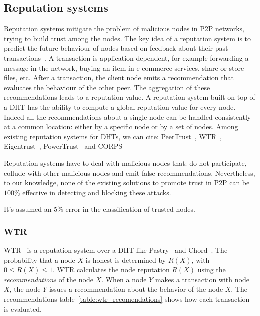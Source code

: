 \subsection{Reputation systems}
\label{sec:reputation_systems}
Reputation systems mitigate the problem of malicious nodes in
P2P networks, trying to build trust among the nodes. The key
idea of a reputation system is to predict the future behaviour
of nodes based on feedback about their past
transactions~\cite{Resnick:2000:RS:355112.355122}. A
transaction is application dependent, for example forwarding a
message in the network, buying an item in e-commerce services,
share or store files, etc. After a transaction, the client node emits
a recommendation that evaluates the behaviour of the other peer.
The aggregation of these recommendations leads to a reputation
value.
A reputation system built on top of a DHT has the ability
to compute a global reputation value for every node. Indeed
all the recommendations about a single node can be handled
consistently at a common location: either by a specific node
or by a set of nodes. Among existing reputation systems for
DHTs, we can cite: PeerTrust~\cite{xiong2004peertrust}, WTR~\cite{bonnaire2009wtr},
Eigentrust~\cite{kamvar2003eigentrust},
PowerTrust~\cite{rahbar2007powertrust} and CORPS~\cite{rosas2011corps}

Reputation systems have to deal with malicious nodes that:
do not participate, collude with other malicious nodes and
emit false recommendations. Nevertheless, to our knowledge,
none of the existing solutions to promote trust in P2P can be
$100\%$ effective in detecting and blocking these attacks.

It's assumed an $5\%$ error in the classification of trusted nodes.

\subsubsection{WTR}
\label{sec:wtr}
WTR~\cite{bonnaire2009wtr} is a reputation system over a DHT like Pastry~\cite{pastry} and
Chord~\cite{chord}. The probability that a node $X$ is honest is determined by
$R(X)$, with $0 \leq R(X) \leq 1$. WTR calculates the node reputation $R(X)$
using the \textit{recommendations} of the node $X$. When a node $Y$ makes a transaction with
node $X$, the node $Y$ issues a recommendation about the behavior of the node
$X$. The recommendations table~\ref{table:wtr_recomendations} shows how each
transaction is evaluated.
 

